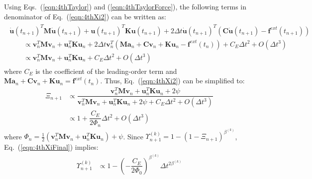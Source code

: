 \documentclass[review]{elsarticle}
\begin{document}
Using Eqs.~(\ref{eqn:4thTaylor}) and (\ref{eqn:4thTaylorForce}), the following terms in denominator of Eq.~(\ref{eqn:4thXi2}) can be written as:
\begin{align}
    \begin{array}{l}
    \dot{\boldsymbol{u}}(t_{n+1})^T\boldsymbol{M}\dot{\boldsymbol{u}}(t_{n+1}) + \boldsymbol{u}(t_{n+1})^T\boldsymbol{K}\boldsymbol{u}(t_{n+1}) + 2\Delta t \dot{\boldsymbol{u}}(t_{n+1})^T (\boldsymbol{C} \dot{\boldsymbol{u}}(t_{n+1})-\boldsymbol{f}^{ext}(t_{n+1})) \\
    \qquad \propto \boldsymbol{v}_n^T\boldsymbol{M}\boldsymbol{v}_n + \boldsymbol{u}_n^T\boldsymbol{K}\boldsymbol{u}_n + 2\Delta t \boldsymbol{v}_n^T ( \boldsymbol{M}\boldsymbol{a}_n + \boldsymbol{C} \boldsymbol{v}_n + \boldsymbol{K} \boldsymbol{u}_n - \boldsymbol{f}^{ext}(t_{n}))  + C_E \Delta t^2 + O(\Delta t^3)
    \\
    \qquad \propto \boldsymbol{v}_n^T\boldsymbol{M}\boldsymbol{v}_n + \boldsymbol{u}_n^T\boldsymbol{K}\boldsymbol{u}_n + C_E \Delta t^2 + O(\Delta t^3)
    \end{array}  \label{eqn:4thTaylorEnergy}
\end{align}
where $C_E$ is the coefficient of the leading-order term and $\boldsymbol{M}\boldsymbol{a}_n + \boldsymbol{C} \boldsymbol{v}_n + \boldsymbol{K} \boldsymbol{u}_n = \boldsymbol{f}^{ext}(t_{n})$.
Thus, Eq.~(\ref{eqn:4thXi2}) can be simplified to:
\begin{equation}
    \begin{array}{ll}
        \Xi_{n+1} &\propto \dfrac{ \boldsymbol{v}_n^T\boldsymbol{M}\boldsymbol{v}_n + \boldsymbol{u}_n^T\boldsymbol{K}\boldsymbol{u}_n + 2\psi}{ \boldsymbol{v}_n^T\boldsymbol{M}\boldsymbol{v}_n + \boldsymbol{u}_n^T\boldsymbol{K}\boldsymbol{u}_n + 2\psi + C_E \Delta t^{2} + O(\Delta t^{3})} \\
        & \propto 1 + \dfrac{C_E}{2\Phi_n} \Delta t^2 + O(\Delta t^3)
    \end{array}    
    \label{eqn:4thXiFinal}
\end{equation}
where $\Phi_n = \frac{1}{2}\left(\boldsymbol{v}_n^T\boldsymbol{M}\boldsymbol{v}_n + \boldsymbol{u}_n^T\boldsymbol{K}\boldsymbol{u}_n \right) + \psi$.
Since $\Upsilon^{(k)}_{n+1}=1-(1-\Xi_{n+1})^{\beta^{(k)}}$, Eq.~(\ref{eqn:4thXiFinal}) implies:
\begin{equation}
    \begin{array}{ll}
    \Upsilon^{(k)}_{n+1} &\propto 1 - \left(- \dfrac{C_E}{2\Phi_0}\right)^{\beta^{(k)}} \Delta t^{2\beta^{(k)}}
   \end{array}
   \label{eqn:4thUpsilonLTE}
\end{equation}
\end{document}
